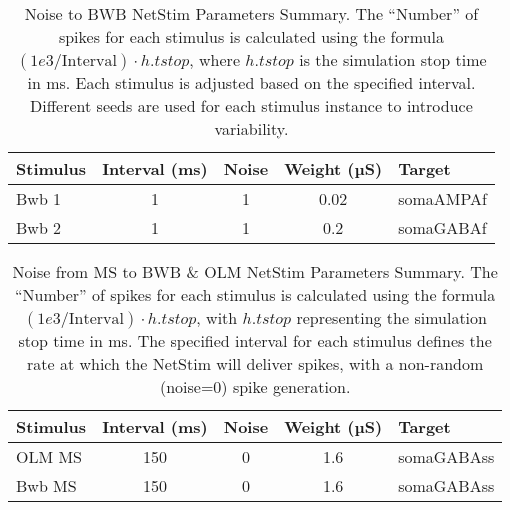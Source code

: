 \begin{table}[htbp]
    \centering
    \caption[Noise to BWB Parameters]{Noise to BWB NetStim Parameters Summary.
        The ``Number'' of spikes for each stimulus is calculated using the formula \((1e3 / \text{Interval}) \cdot h.tstop\),
        where \(h.tstop\) is the simulation stop time in ms. Each stimulus is adjusted based on the specified interval.
        Different seeds are used for each stimulus instance to introduce variability.}\label{tab:noise_to_BWB}
    \begin{tabular}{lcccl}
        \hline
        Stimulus & Interval (ms) & Noise & Weight (µS) & Target    \\
        \hline
        Bwb 1    & 1             & 1     & 0.02        & somaAMPAf \\
        Bwb 2    & 1             & 1     & 0.2         & somaGABAf \\
        \hline
    \end{tabular}
\end{table}

\begin{table}[htbp]
    \centering
    \caption[Noise from MS to BWB \& OLM Parameters]{Noise from MS to BWB \& OLM NetStim Parameters Summary.
        The ``Number'' of spikes for each stimulus is calculated using the formula \((1e3 / \text{Interval}) \cdot h.tstop\),
        with \(h.tstop\) representing the simulation stop time in ms.
        The specified interval for each stimulus defines the rate at which the NetStim will deliver spikes,
        with a non-random (noise=0) spike generation.}\label{tab:noise_from_MS_to_BWB_OLM}
    \begin{tabular}{lcccl}
        \hline
        Stimulus & Interval (ms) & Noise & Weight (µS) & Target     \\
        \hline
        OLM MS   & 150           & 0     & 1.6         & somaGABAss \\
        Bwb MS   & 150           & 0     & 1.6         & somaGABAss \\
        \hline
    \end{tabular}
\end{table}
